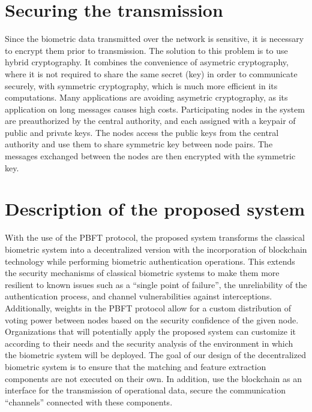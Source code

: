 \section{Securing the transmission}
Since the biometric data transmitted over the network is sensitive, it is necessary to encrypt them prior to transmission. The solution to this problem is to use hybrid cryptography. It combines the convenience of asymetric cryptography, where it is not required to share the same secret (key) in order to communicate securely, with symmetric cryptography, which is much more efficient in its computations. Many applications are avoiding asymetric cryptography, as its application on long messages causes high costs.
Participating nodes in the system are preauthorized by the central authority, and each assigned with a keypair of public and private keys. The nodes access the public keys from the central authority and use them to share symmetric key between node pairs. The messages exchanged between the nodes are then encrypted with the symmetric key.


\section{Description of the proposed system}
With the use of the PBFT protocol, the proposed system transforms the classical biometric system into a decentralized version with the incorporation of blockchain technology while performing biometric authentication operations. This extends the security mechanisms of classical biometric systems to make them more resilient to known issues such as a ``single point of failure'', the unreliability of the authentication process, and channel vulnerabilities against interceptions. Additionally, weights in the PBFT protocol allow for a custom distribution of voting power between nodes based on the security confidence of the given node. Organizations that will potentially apply the proposed system can customize it according to their needs and the security analysis of the environment in which the biometric system will be deployed. 
The goal of our design of the decentralized biometric system is to ensure that the matching and feature extraction components are not executed on their own. In addition, use the blockchain as an interface for the transmission of operational data, secure the communication ``channels'' connected with these components. 

